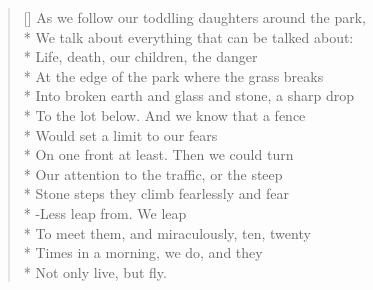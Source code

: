 \label{ch:falling_child}
\settowidth{\versewidth}{As we follow our toddling daughters around the park,}
\begin{verse}[\versewidth]
As we follow our toddling daughters around the park,\\*
We talk about everything that can be talked about:\\*
Life, death, our children, the danger\\*
At the edge of the park where the grass breaks\\*
Into broken earth and glass and stone, a sharp drop\\*
To the lot below.   And we know that a fence\\*
Would set a limit to our fears\\*
On one front at least.   Then we could turn\\*
Our attention to the traffic, or the steep\\*
Stone steps they climb fearlessly and fear\\*
-Less leap from.   We leap\\*
To meet them, and miraculously, ten, twenty\\*
Times in a morning, we do, and they\\*
Not only live, but fly.
\end{verse}
